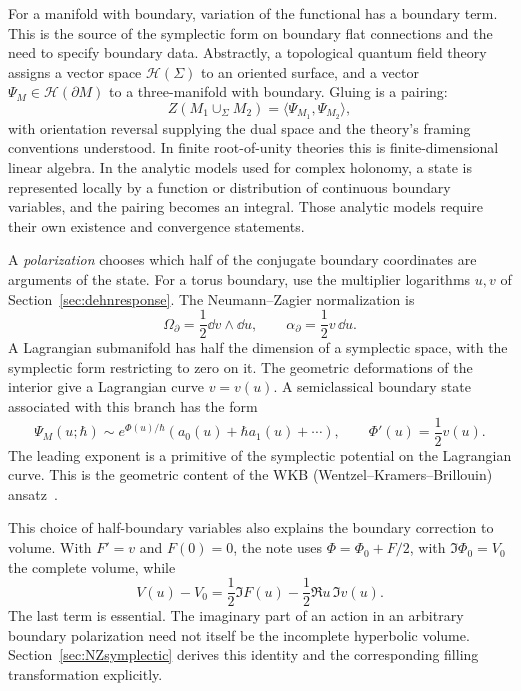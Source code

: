 For a manifold with boundary, variation of the functional has a
boundary term. This is the source of the symplectic form on boundary
flat connections and the need to specify boundary data. Abstractly,
a topological quantum field theory assigns a vector space
$\mathcal H(\Sigma)$ to an oriented surface, and a vector
$\Psi_M\in\mathcal H(\partial M)$ to a three-manifold with boundary.
Gluing is a pairing:
\[
 Z(M_1\cup_\Sigma M_2)=\langle\Psi_{M_1},\Psi_{M_2}\rangle,
\]
with orientation reversal supplying the dual space and the theory's
framing conventions understood. In finite root-of-unity theories
this is finite-dimensional linear algebra. In the analytic models
used for complex holonomy, a state is represented locally by a
function or distribution of continuous boundary variables, and
the pairing becomes an integral. Those analytic models require
their own existence and convergence statements.

A \emph{polarization} chooses which half of the conjugate boundary
coordinates are arguments of the state. For a torus boundary,
use the multiplier logarithms $u,v$ of Section~\ref{sec:dehnresponse}.
The Neumann--Zagier normalization is
\begin{equation}
 \Omega_\partial=\frac12\dd v\wedge\dd u,
 \qquad \alpha_\partial=\frac12v\,\dd u.
 \label{eq:introNZpolarization}
\end{equation}
A Lagrangian submanifold has half the dimension of a symplectic
space, with the symplectic form restricting to zero on it.
The geometric deformations of the interior give a Lagrangian curve
$v=v(u)$. A semiclassical boundary state associated with this
branch has the form
\begin{equation}
 \Psi_M(u;\hbar)\sim e^{\Phi(u)/\hbar}
       (a_0(u)+\hbar a_1(u)+\cdots),\qquad
 \Phi'(u)=\frac12v(u).
 \label{eq:introWKBstate}
\end{equation}
The leading exponent is a primitive of the symplectic potential
on the Lagrangian curve. This is the geometric content of the WKB
(Wentzel--Kramers--Brillouin) ansatz~\cite{DimofteQuantumRS}.

This choice of half-boundary variables also explains the boundary
correction to volume. With $F'=v$ and $F(0)=0$, the note uses
$\Phi=\Phi_0+F/2$, with $\Im\Phi_0=V_0$ the complete volume, while
\begin{equation}
 V(u)-V_0=\frac12\Im F(u)-\frac12\Re u\,\Im v(u).
 \label{eq:introvolumeboundary}
\end{equation}
The last term is essential. The imaginary part of an action in an
arbitrary boundary polarization need not itself be the incomplete
hyperbolic volume. Section~\ref{sec:NZsymplectic} derives this
identity and the corresponding filling transformation explicitly.

